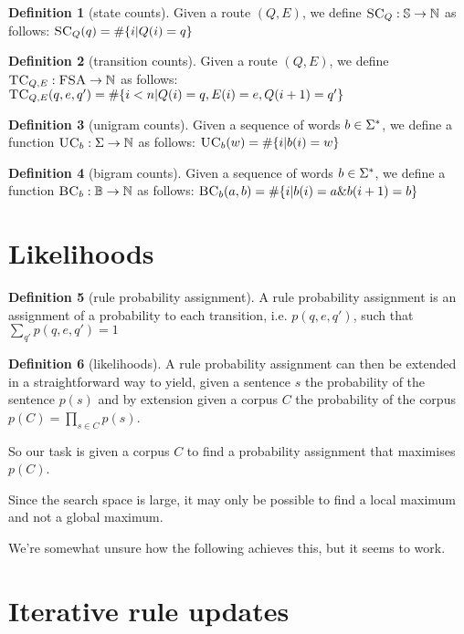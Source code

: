 \documentclass[12pt]{article}
\theoremstyle{definition}
\newtheorem{definition}{Definition}[section]
\begin{document}
\begin{definition}[state counts]
  Given a route $(Q,E)$, we define $\textsc{SC}_Q : \mathbb{S} \rightarrow\mathbb{N}$ as follows: $\textsc{SC}_Q(q) = \#\{ i | Q(i)=q \}$
\end{definition}


\begin{definition}[transition counts]
  Given a route $(Q,E)$, we define $\textsc{TC}_{Q,E} : \textsc{FSA} \rightarrow\mathbb{N}$ as follows: $\textsc{TC}_{Q,E}(q,e,q') = \#\{ i<n | Q(i)=q,E(i)=e,Q({i+1})=q'\}$
\end{definition}

\begin{definition}[unigram counts]
  Given a sequence of words $b\in\Sigma^*$, we define a function $\textsc{UC}_b : \Sigma \rightarrow\mathbb{N}$ as follows: $\textsc{UC}_b(w) = \#\{ i | b(i) = w \}$
\end{definition}


\begin{definition}[bigram counts]
  Given a sequence of words $b\in\Sigma^*$, we define a function $\textsc{BC}_{b} : \mathbb{B} \rightarrow\mathbb{N}$ as follows: $\textsc{BC}_b(a,b) = \#\{ i | b(i)=a \& b(i+1) = b \}$
\end{definition}


\section{Likelihoods}

\begin{definition}[rule probability assignment]
A rule probability assignment is an assignment of a probability to each transition, i.e. $p(q,e,q')$, such that $\sum_{q'}p(q,e,q')=1$
\end{definition}

\begin{definition}[likelihoods]
A rule probability assignment can then be extended in a straightforward way to yield, given a sentence $s$ the probability of the sentence $p(s)$ and by extension given a corpus $C$ the probability of the corpus $p(C)=\prod_{s\in C}p(s)$.
\end{definition}

So our task is given a corpus $C$ to find a probability assignment that maximises $p(C)$. 

Since the search space is large, it may only be possible to find a local maximum and not a global maximum.

We're somewhat unsure how the following achieves this, but it seems to work.


\section{Iterative rule updates}
\end{document}
